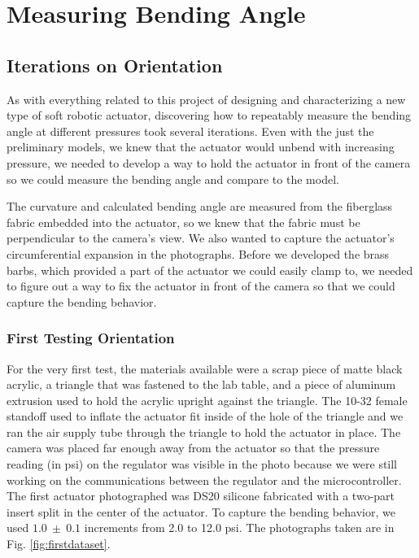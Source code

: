 \chapter{Measuring Bending Angle}

\section{Iterations on Orientation}

As with everything related to this project of designing and characterizing a new type of soft robotic actuator, discovering how to repeatably measure the bending angle at different pressures took several iterations. Even with the just the preliminary models, we knew that the actuator would unbend with increasing pressure, we needed to develop a way to hold the actuator in front of the camera so we could measure the bending angle and compare to the model. 

The curvature and calculated bending angle are measured from the fiberglass fabric embedded into the actuator, so we knew that the fabric must be perpendicular to the camera's view. We also wanted to capture the actuator's circumferential expansion in the photographs. Before we developed the brass barbs, which provided a part of the actuator we could easily clamp to, we needed to figure out a way to fix the actuator in front of the camera so that we could capture the bending behavior. 

\subsection{First Testing Orientation}

For the very first test, the materials available were a scrap piece of matte black acrylic, a triangle that was fastened to the lab table, and a piece of aluminum extrusion used to hold the acrylic upright against the triangle. The 10-32 female standoff used to inflate the actuator fit inside of the hole of the triangle and we ran the air supply tube through the triangle to hold the actuator in place. The camera was placed far enough away from the actuator so that the pressure reading (in psi) on the regulator was visible in the photo because we were still working on the communications between the regulator and the microcontroller. The first actuator photographed was DS20 silicone fabricated with a two-part insert split in the center of the actuator. To capture the bending behavior, we used $1.0~\pm~0.1$ increments from 2.0 to 12.0 psi. The photographs taken are in Fig. \ref{fig:firstdataset}. 

